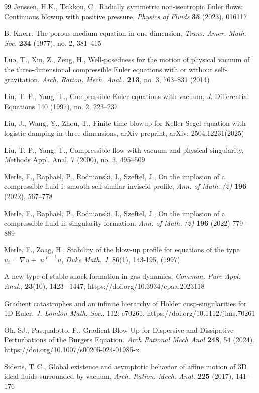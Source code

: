 \documentclass{article}
\numberwithin{equation}{section}
\begin{document}
\begin{thebibliography}{99}
{Jenssen, H.K.,  Tsikkou, C.},  
Radially symmetric non-isentropic Euler flows: Continuous blowup with positive pressure, \emph{Physics of Fluids} \textbf{35} (2023), 016117 




B. Knerr. 
The porous medium equation in one dimension,  
\emph{Trans. Amer. Math. Soc.} \textbf{234} (1977), no. 2, 381--415




Luo, T., Xin, Z., Zeng, H., 
Well-posedness for the motion of physical vacuum of the three-dimensional compressible Euler equations with or without self-gravitation. 
\emph{Arch. Ration. Mech. Anal.}, \textbf{213}, no. 3, 763--831 (2014)


Liu, T.-P., Yang, T., Compressible Euler equations with vacuum, {\emph J. Differential Equations} 140 (1997),
no. 2, 223--237

{Liu, J., Wang, Y., Zhou, T.,} Finite time blowup for Keller-Segel equation with logistic damping in three dimensions, arXiv preprint, arXiv: 2504.12231(2025)

 Liu, T.-P., Yang, T., 
Compressible flow with vacuum and physical singularity, {\emph Methods Appl. Anal.} 7 (2000), no. 3, 495--509 



 {Merle, F., Rapha\"el, P.,  Rodnianski, I., Szeftel, J.}, On the implosion of a compressible fluid i: smooth self-similar inviscid profile, \emph{Ann. of Math. (2)} \textbf{196} (2022), 567--778

{Merle, F., Rapha\"el, P.,  Rodnianski, I., Szeftel, J.},
On the implosion of a compressible fluid
ii: singularity formation. \emph{Ann. of Math. (2)} \textbf{196} (2022) 779--889

Merle, F., Zaag, H.,  Stability of the blow-up profile for equations of the type $u_t=\nabla u +|u|^{p-1}u$,  \emph{Duke Math. J.} 86(1), 143-195, (1997)


A new type of stable shock formation in gas dynamics, \emph{Commun. Pure Appl. Anal.}, \textbf{23}(10), 1423–
1447, https://doi.org/10.3934/cpaa.2023118

 Gradient catastrophes and an infinite hierarchy of H\"older cusp-singularities for 1D Euler,  \emph{J. London Math. Soc.}, 112: e70261. https://doi.org/10.1112/jlms.70261

{Oh, SJ., Pasqualotto, F.}, Gradient Blow-Up for Dispersive and Dissipative Perturbations of the Burgers Equation. \emph{Arch Rational Mech Anal} \textbf{248}, 54 (2024). https://doi.org/10.1007/s00205-024-01985-x


{Sideris, T.\,C.,} Global existence and asymptotic behavior of affine motion of 3D ideal fluids surrounded by vacuum,
\emph{Arch. Ration. Mech. Anal.} \textbf{225} (2017), 141–176


\end{thebibliography}
\end{document}
